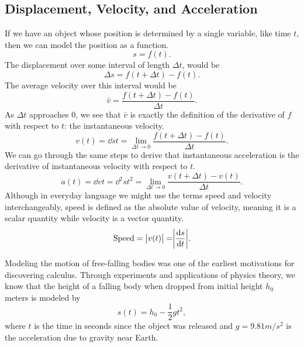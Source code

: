 \subsection{Displacement, Velocity, and Acceleration}
If we have an object whose position is determined by a single variable, like time $t$, then we can model the position as a function.
\begin{equation*}
	s = f(t).
\end{equation*}
The displacement over some interval of length $\Delta t$, would be
\begin{equation*}
	\Delta s = f(t + \Delta t) - f(t).
\end{equation*}
The average velocity over this interval would be
\begin{equation*}
	\bar{v} = \frac{f(t + \Delta t) - f(t)}{\Delta t}.
\end{equation*}
As $\Delta t$ approaches 0, we see that $\bar{v}$ is exactly the definition of the derivative of $f$ with respect to $t$: the instantaneous velocity.
\begin{equation*}
	v(t) = \dd{s}{t} = \lim_{\Delta t \to 0}{\frac{f(t + \Delta t) - f(t)}{\Delta t}}.
\end{equation*}
We can go through the same steps to derive that instantaneous acceleration is the derivative of instantaneous velocity with respect to $t$.
\begin{equation*}
	a(t) = \dd{v}{t} = \dd{{}^2s}{t^2} = \lim_{\Delta t \to 0}{\frac{v(t + \Delta t) - v(t)}{\Delta t}}.
\end{equation*}
Although in everyday language we might use the terms speed and velocity interchangeably, speed is defined as the absolute value of velocity, meaning it is a scalar quantity while velocity is a vector quantity.
\begin{equation*}
	\text{Speed} = \big\lvert v(t) \big\rvert = \biggr\lvert \frac{\mathrm{d} s}{\mathrm{d} t} \biggr\rvert.
\end{equation*}


Modeling the motion of free-falling bodies was one of the earliest motivations for discovering calculus.
Through experiments and applications of physics theory, we know that the height of a falling body when dropped from initial height $h_0$ meters is modeled by
\begin{equation*}
	s(t) = h_0 - \frac{1}{2}gt^2,
\end{equation*}
where $t$ is the time in seconds since the object was released and $g = 9.81m/s^2$ is the acceleration due to gravity near Earth.

